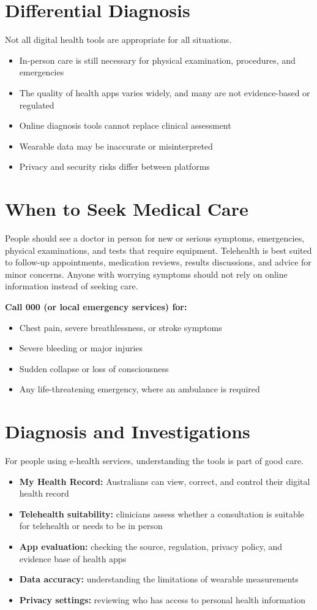 \section*{Differential Diagnosis}
Not all digital health tools are appropriate for all situations.
\begin{itemize}
    \item In-person care is still necessary for physical examination, procedures, and emergencies
    \item The quality of health apps varies widely, and many are not evidence-based or regulated
    \item Online diagnosis tools cannot replace clinical assessment
    \item Wearable data may be inaccurate or misinterpreted
    \item Privacy and security risks differ between platforms
\end{itemize}

\section*{When to Seek Medical Care}
People should see a doctor in person for new or serious symptoms, emergencies, physical examinations, and tests that require equipment. Telehealth is best suited to follow-up appointments, medication reviews, results discussions, and advice for minor concerns. Anyone with worrying symptoms should not rely on online information instead of seeking care.

\textbf{Call 000 (or local emergency services) for:}
\begin{itemize}
    \item Chest pain, severe breathlessness, or stroke symptoms
    \item Severe bleeding or major injuries
    \item Sudden collapse or loss of consciousness
    \item Any life-threatening emergency, where an ambulance is required
\end{itemize}

\section*{Diagnosis and Investigations}
For people using e-health services, understanding the tools is part of good care.
\begin{itemize}
    \item \textbf{My Health Record:} Australians can view, correct, and control their digital health record
    \item \textbf{Telehealth suitability:} clinicians assess whether a consultation is suitable for telehealth or needs to be in person
    \item \textbf{App evaluation:} checking the source, regulation, privacy policy, and evidence base of health apps
    \item \textbf{Data accuracy:} understanding the limitations of wearable measurements
    \item \textbf{Privacy settings:} reviewing who has access to personal health information
\end{itemize}

